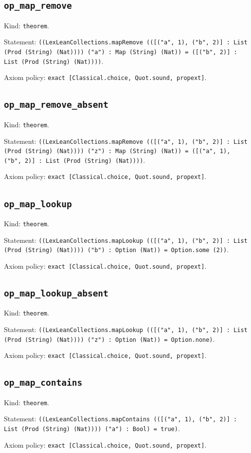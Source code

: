 \documentclass[11pt]{article}
\begin{document}
\subsection*{\texttt{op\_map\_remove}}
\noindent Kind: \texttt{theorem}.\par
\noindent Statement: \texttt{((LexLeanCollections.mapRemove (([("a", 1), ("b", 2)] : List (Prod (String) (Nat)))) ("a") : Map (String) (Nat)) = ([("b", 2)] : List (Prod (String) (Nat))))}.\par
\noindent Axiom policy: \texttt{exact [Classical.choice, Quot.sound, propext]}.\par
\subsection*{\texttt{op\_map\_remove\_absent}}
\noindent Kind: \texttt{theorem}.\par
\noindent Statement: \texttt{((LexLeanCollections.mapRemove (([("a", 1), ("b", 2)] : List (Prod (String) (Nat)))) ("z") : Map (String) (Nat)) = ([("a", 1), ("b", 2)] : List (Prod (String) (Nat))))}.\par
\noindent Axiom policy: \texttt{exact [Classical.choice, Quot.sound, propext]}.\par
\subsection*{\texttt{op\_map\_lookup}}
\noindent Kind: \texttt{theorem}.\par
\noindent Statement: \texttt{((LexLeanCollections.mapLookup (([("a", 1), ("b", 2)] : List (Prod (String) (Nat)))) ("b") : Option (Nat)) = Option.some (2))}.\par
\noindent Axiom policy: \texttt{exact [Classical.choice, Quot.sound, propext]}.\par
\subsection*{\texttt{op\_map\_lookup\_absent}}
\noindent Kind: \texttt{theorem}.\par
\noindent Statement: \texttt{((LexLeanCollections.mapLookup (([("a", 1), ("b", 2)] : List (Prod (String) (Nat)))) ("z") : Option (Nat)) = Option.none)}.\par
\noindent Axiom policy: \texttt{exact [Classical.choice, Quot.sound, propext]}.\par
\subsection*{\texttt{op\_map\_contains}}
\noindent Kind: \texttt{theorem}.\par
\noindent Statement: \texttt{((LexLeanCollections.mapContains (([("a", 1), ("b", 2)] : List (Prod (String) (Nat)))) ("a") : Bool) = true)}.\par
\noindent Axiom policy: \texttt{exact [Classical.choice, Quot.sound, propext]}.\par
\end{document}
